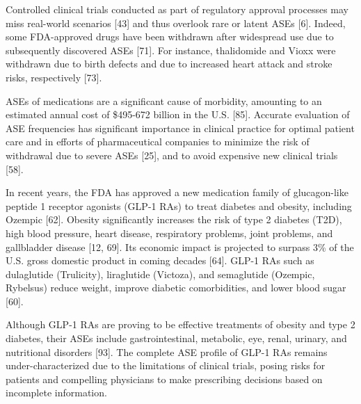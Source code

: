 \documentclass[referee,bst/sn-basic]{sn-jnl}%
\begin{document}
Controlled clinical trials conducted as part of regulatory approval processes may miss real-world scenarios [43] 
and thus overlook rare or latent ASEs [6]. 
Indeed, some FDA-approved drugs have been withdrawn after widespread use due to subsequently discovered ASEs [71]. 
For instance, thalidomide and Vioxx were withdrawn due to birth defects and due to increased heart attack and stroke risks, respectively [73]. 

ASEs of medications are a significant cause of morbidity, amounting to an estimated annual cost of \$495-672 billion in the U.S. [85]. 
Accurate evaluation of ASE frequencies has significant importance in clinical practice for optimal patient care and in efforts of pharmaceutical companies to minimize the risk of withdrawal due to severe ASEs [25], 
and to avoid expensive new clinical trials [58]. 

In recent years, the FDA has approved a new medication family of glucagon-like peptide 1 receptor agonists (GLP-1 RAs) to treat diabetes and obesity, including Ozempic [62]. 
Obesity significantly increases the risk of type 2 diabetes (T2D), high blood pressure, heart disease, respiratory problems, joint problems, and gallbladder disease [12, 69]. 
Its economic impact is projected to surpass 3\% of the U.S. gross domestic product in coming decades [64]. 
GLP-1 RAs such as dulaglutide (Trulicity), liraglutide (Victoza), and semaglutide (Ozempic, Rybelsus) reduce weight, improve diabetic comorbidities, and lower blood sugar [60]. 

Although GLP-1 RAs are proving to be effective treatments of obesity and type 2 diabetes, their ASEs include gastrointestinal, metabolic, eye, renal, urinary, and nutritional disorders [93]. 
The complete ASE profile of GLP-1 RAs remains under-characterized due to the limitations of clinical trials, posing risks for patients and compelling physicians to make prescribing decisions based on incomplete information.
\end{document}
